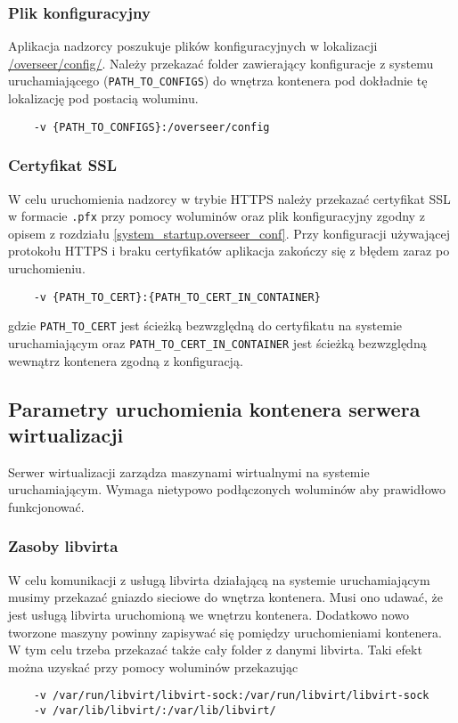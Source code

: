 \documentclass[../opis-rozwiazania.tex]{subfiles}
\begin{document}
\subsubsection{Plik konfiguracyjny}
Aplikacja nadzorcy poszukuje plików konfiguracyjnych w lokalizacji \url{/overseer/config/}.
Należy przekazać folder zawierający konfiguracje z systemu uruchamiającego (\texttt{PATH\_TO\_CONFIGS}) do wnętrza kontenera pod dokładnie tę lokalizację pod postacią woluminu.
\begin{verbatim}
	-v {PATH_TO_CONFIGS}:/overseer/config
\end{verbatim}

\subsubsection{Certyfikat SSL}
W celu uruchomienia nadzorcy w trybie HTTPS należy przekazać certyfikat SSL w formacie \texttt{.pfx} przy pomocy woluminów oraz plik konfiguracyjny zgodny z opisem z rozdziału \ref{system_startup.overseer_conf}.
Przy konfiguracji używającej protokołu HTTPS i braku certyfikatów aplikacja zakończy się z błędem zaraz po uruchomieniu.

\begin{verbatim}
	-v {PATH_TO_CERT}:{PATH_TO_CERT_IN_CONTAINER}
\end{verbatim}
gdzie \texttt{PATH\_TO\_CERT} jest ścieżką bezwzględną do certyfikatu na systemie uruchamiającym oraz \texttt{PATH\_TO\_CERT\_IN\_CONTAINER} jest ścieżką bezwzględną wewnątrz kontenera zgodną z konfiguracją.

\subsection{Parametry uruchomienia kontenera serwera wirtualizacji}
Serwer wirtualizacji zarządza maszynami wirtualnymi na systemie uruchamiającym.
Wymaga nietypowo podłączonych woluminów aby prawidłowo funkcjonować.

\subsubsection{Zasoby libvirta}
W celu komunikacji z usługą libvirta działającą na systemie uruchamiającym musimy przekazać gniazdo sieciowe do wnętrza kontenera.
Musi ono udawać, że jest usługą libvirta uruchomioną we wnętrzu kontenera.
Dodatkowo nowo tworzone maszyny powinny zapisywać się pomiędzy uruchomieniami kontenera.
W tym celu trzeba przekazać także cały folder z danymi libvirta.
Taki efekt można uzyskać przy pomocy woluminów przekazując
\begin{verbatim}
	-v /var/run/libvirt/libvirt-sock:/var/run/libvirt/libvirt-sock
	-v /var/lib/libvirt/:/var/lib/libvirt/
\end{verbatim}
\end{document}
